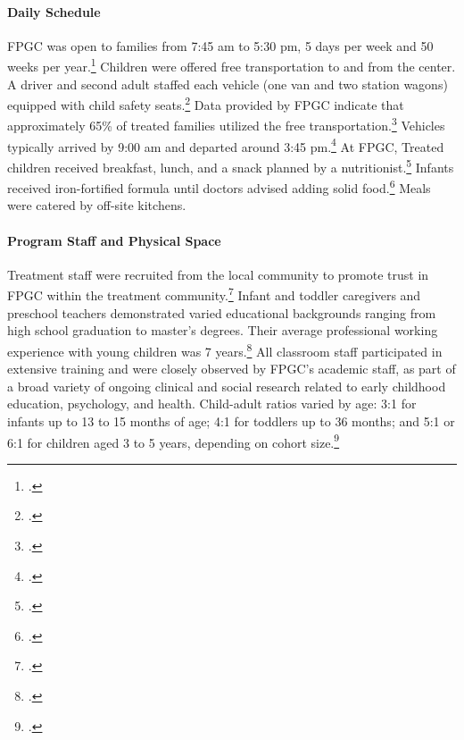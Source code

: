 \begin{appendices}
\paragraph{Daily Schedule}
\noindent FPGC was open to families from 7:45 am to 5:30 pm, 5 days per week and 50 weeks per year.\footnote{\citet{Ramey_Collier_etal_1976_CarolinaAbecedarianProject}.} Children were offered free transportation to and from the center. A driver and second adult staffed each vehicle (one van and two station wagons) equipped with child safety seats.\footnote{\citet{Ramey_Campbell_1979_SR,abc2014-2015interviews}.} Data provided by FPGC indicate that approximately 65\% of treated families utilized the free transportation.\footnote{\citet{Barnett_Masse_2002_benefitcost}.} Vehicles typically arrived by 9:00 am and departed around 3:45 pm.\footnote{\citet{Ramey-et-al_1977_Intro-to-ABC}.} At FPGC, Treated children received breakfast, lunch, and a snack planned by a nutritionist.\footnote{ \citet{Haskins_1985_CD,Ramey-et-al_1977_Intro-to-ABC}.} Infants received iron-fortified formula until doctors advised adding solid food.\footnote{\citet{Campbell_Conti_etal_2014_EarlyChildhoodInvestments,abc2014-2015interviews}.} Meals were catered by off-site kitchens. \\

\paragraph{Program Staff and Physical Space}
\noindent Treatment staff were recruited from the local community to promote trust in FPGC within the treatment community.\footnote{\citet{Ramey-et-al_1977_Intro-to-ABC,Feagans_1996_Childrens-Talk,abc2014-2015interviews}.} Infant and toddler caregivers and preschool teachers demonstrated varied educational backgrounds ranging from high school graduation to master's degrees. Their average professional working experience with young children was 7 years.\footnote{\citet{Ramey_McGinness_etal_1982_Abecedarianapproach}.} All classroom staff participated in extensive training and were closely observed by FPGC's academic staff, as part of a broad variety of ongoing clinical and social research related to early childhood education, psychology, and health. Child-adult ratios varied by age: 3:1 for infants up to 13 to 15 months of age; 4:1 for toddlers up to 36 months; and 5:1 or 6:1 for children aged 3 to 5 years, depending on cohort size.\footnote{\citet{Ramey-et-al_1977_Intro-to-ABC,Ramey_Campbell_1979_SR,Ramey_McGinness_etal_1982_Abecedarianapproach}.}\\


\end{appendices}
